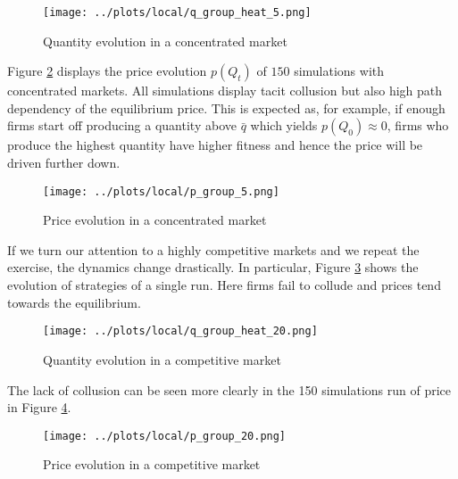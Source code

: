 \documentclass[american]{scrartcl}
\begin{document}
\begin{center}
    \begin{figure}[H]
        \center
        \texttt{[image: ../plots/local/q\_group\_heat\_5.png]}
        \caption{Quantity evolution in a concentrated market}
        \label{fig:small_local}
    \end{figure}
\end{center}

Figure \ref{fig:price_small_local} displays the price evolution $p(Q_t)$ of $150$ simulations with concentrated markets. All simulations display tacit collusion but also high path dependency of the equilibrium price. This is expected as, for example, if enough firms start off producing a quantity above $\bar{q}$ which yields $p(Q_0) \approx 0$, firms who produce the highest quantity have higher fitness and hence the price will be driven further down.

\begin{center}
    \begin{figure}[H]
        \center
        \texttt{[image: ../plots/local/p\_group\_5.png]}
        \caption{Price evolution in a concentrated market}
        \label{fig:price_small_local}
    \end{figure}
\end{center}

If we turn our attention to a highly competitive markets and we repeat the exercise, the dynamics change drastically. In particular, Figure \ref{fig:large_local} shows the evolution of strategies of a single run. Here firms fail to collude and prices tend towards the equilibrium.

\begin{center}
    \begin{figure}[H]
        \center
        \texttt{[image: ../plots/local/q\_group\_heat\_20.png]}
        \caption{Quantity evolution in a competitive market}
        \label{fig:large_local}
    \end{figure}
\end{center}

The lack of collusion can be seen more clearly in the 150 simulations run of price in Figure \ref{fig:price_large_local}.

\begin{center}
    \begin{figure}[H]
        \center
        \texttt{[image: ../plots/local/p\_group\_20.png]}
        \caption{Price evolution in a competitive market}
        \label{fig:price_large_local}
    \end{figure}
\end{center}
\end{document}
